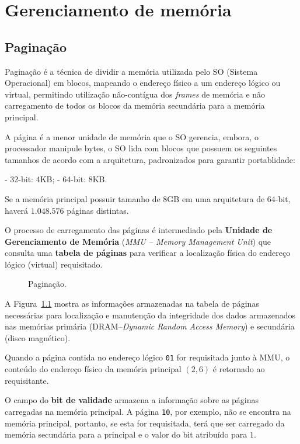 
\chapter{Gerenciamento de memória}

\section{Paginação}

Paginação é a técnica de dividir a memória utilizada pelo SO (Sistema
Operacional) em blocos, mapeando o endereço físico a um endereço
lógico ou virtual, permitindo utilização não-contígua dos {\em frames}
de memória e não carregamento de todos os blocos da memória secundária
para a memória principal.

A página é a menor unidade de memória que o SO gerencia, embora, o
processador manipule bytes, o SO lida com blocos que possuem os
seguintes tamanhos de acordo com a arquitetura, padronizados para
garantir portablidade:

- 32-bit: 4KB;
- 64-bit: 8KB.

Se a memória principal possuir tamanho de 8GB em uma arquitetura de
64-bit, haverá $1.048.576$ páginas distintas.

O processo de carregamento das páginas é intermediado pela {\bf
Unidade de Gerenciamento de Memória} ({\em MMU -- Memory Management
Unit}) que consulta uma {\bf tabela de páginas} para verificar 
a localização física do endereço lógico (virtual) requisitado.

\begin{figure}

\label{fig:paging}
\caption{Paginação.}
\end{figure}

A Figura~\ref{fig:paging} mostra as informações armazenadas
na tabela de páginas necessárias para localização e manutenção
da integridade dos dados armazenados nas memórias primária
(DRAM--{\em Dynamic Random Access Memory}) e secundária 
(disco magnético).

Quando a página contida no endereço lógico {\tt 01} for requisitada
junto à MMU, o conteúdo do endereço físico da memória principal
$(2,6)$ é retornado ao requisitante.

O campo do {\bf bit de validade} armazena a informação sobre as
páginas carregadas na memória principal. A página {\tt 10}, por
exemplo, não se encontra na memória principal, portanto, se esta for
requisitada, terá que ser carregado da memória secundária para a
principal e o valor do bit atribuído para $1$.

